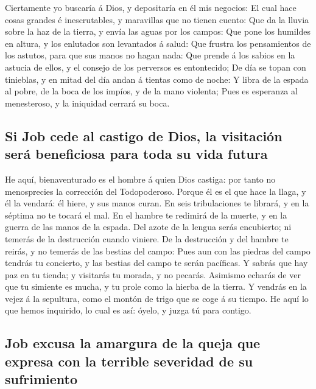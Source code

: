  Ciertamente yo buscaría á Dios, y depositaría en él mis
negocios:  El cual hace cosas grandes é inescrutables, y
maravillas que no tienen cuento:  Que da la lluvia sobre
la haz de la tierra, y envía las aguas por los campos: 
Que pone los humildes en altura, y los enlutados son levantados á salud:
 Que frustra los pensamientos de los astutos, para que
sus manos no hagan nada:  Que prende á los sabios en la
astucia de ellos, y el consejo de los perversos es entontecido;
 De día se topan con tinieblas, y en mitad del día andan
á tientas como de noche:  Y libra de la espada al pobre,
de la boca de los impíos, y de la mano violenta;  Pues es
esperanza al menesteroso, y la iniquidad cerrará su boca.

\hypertarget{si-job-cede-al-castigo-de-dios-la-visitaciuxf3n-seruxe1-beneficiosa-para-toda-su-vida-futura}{%
\subsection{Si Job cede al castigo de Dios, la visitación será
beneficiosa para toda su vida
futura}\label{si-job-cede-al-castigo-de-dios-la-visitaciuxf3n-seruxe1-beneficiosa-para-toda-su-vida-futura}}

 He aquí, bienaventurado es el hombre á quien Dios
castiga: por tanto no menosprecies la corrección del Todopoderoso.
 Porque él es el que hace la llaga, y él la vendará: él
hiere, y sus manos curan.  En seis tribulaciones te
librará, y en la séptima no te tocará el mal.  En el
hambre te redimirá de la muerte, y en la guerra de las manos de la
espada.  Del azote de la lengua serás encubierto; ni
temerás de la destrucción cuando viniere.  De la
destrucción y del hambre te reirás, y no temerás de las bestias del
campo:  Pues aun con las piedras del campo tendrás tu
concierto, y las bestias del campo te serán pacíficas.  Y
sabrás que hay paz en tu tienda; y visitarás tu morada, y no pecarás.
 Asimismo echarás de ver que tu simiente es mucha, y tu
prole como la hierba de la tierra.  Y vendrás en la vejez
á la sepultura, como el montón de trigo que se coge á su tiempo.
 He aquí lo que hemos inquirido, lo cual es así: óyelo, y
juzga tú para contigo.

\hypertarget{job-excusa-la-amargura-de-la-queja-que-expresa-con-la-terrible-severidad-de-su-sufrimiento}{%
\subsection{Job excusa la amargura de la queja que expresa con la
terrible severidad de su
sufrimiento}\label{job-excusa-la-amargura-de-la-queja-que-expresa-con-la-terrible-severidad-de-su-sufrimiento}}

